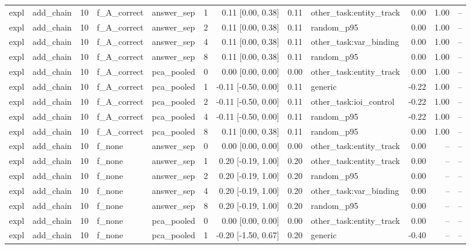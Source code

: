 \begin{tabular}{llrllrrrlrrr}
expl & add\_chain & 10 & f\_A\_correct & answer\_sep & 1 & 0.11 [0.00, 0.38] & 0.11 & other\_task:entity\_track & 0.00 & 1.00 & -- \\
expl & add\_chain & 10 & f\_A\_correct & answer\_sep & 2 & 0.11 [0.00, 0.38] & 0.11 & random\_p95 & 0.00 & 1.00 & -- \\
expl & add\_chain & 10 & f\_A\_correct & answer\_sep & 4 & 0.11 [0.00, 0.38] & 0.11 & other\_task:var\_binding & 0.00 & 1.00 & -- \\
expl & add\_chain & 10 & f\_A\_correct & answer\_sep & 8 & 0.11 [0.00, 0.38] & 0.11 & random\_p95 & 0.00 & 1.00 & -- \\
expl & add\_chain & 10 & f\_A\_correct & pca\_pooled & 0 & 0.00 [0.00, 0.00] & 0.00 & other\_task:entity\_track & 0.00 & 1.00 & -- \\
expl & add\_chain & 10 & f\_A\_correct & pca\_pooled & 1 & -0.11 [-0.50, 0.00] & 0.11 & generic & -0.22 & 1.00 & -- \\
expl & add\_chain & 10 & f\_A\_correct & pca\_pooled & 2 & -0.11 [-0.50, 0.00] & 0.11 & other\_task:ioi\_control & -0.22 & 1.00 & -- \\
expl & add\_chain & 10 & f\_A\_correct & pca\_pooled & 4 & -0.11 [-0.50, 0.00] & 0.11 & random\_p95 & -0.22 & 1.00 & -- \\
expl & add\_chain & 10 & f\_A\_correct & pca\_pooled & 8 & 0.11 [0.00, 0.38] & 0.11 & random\_p95 & 0.00 & 1.00 & -- \\
expl & add\_chain & 10 & f\_none & answer\_sep & 0 & 0.00 [0.00, 0.00] & 0.00 & other\_task:entity\_track & 0.00 & -- & -- \\
expl & add\_chain & 10 & f\_none & answer\_sep & 1 & 0.20 [-0.19, 1.00] & 0.20 & other\_task:entity\_track & 0.00 & -- & -- \\
expl & add\_chain & 10 & f\_none & answer\_sep & 2 & 0.20 [-0.19, 1.00] & 0.20 & random\_p95 & 0.00 & -- & -- \\
expl & add\_chain & 10 & f\_none & answer\_sep & 4 & 0.20 [-0.19, 1.00] & 0.20 & other\_task:var\_binding & 0.00 & -- & -- \\
expl & add\_chain & 10 & f\_none & answer\_sep & 8 & 0.20 [-0.19, 1.00] & 0.20 & random\_p95 & 0.00 & -- & -- \\
expl & add\_chain & 10 & f\_none & pca\_pooled & 0 & 0.00 [0.00, 0.00] & 0.00 & other\_task:entity\_track & 0.00 & -- & -- \\
expl & add\_chain & 10 & f\_none & pca\_pooled & 1 & -0.20 [-1.50, 0.67] & 0.20 & generic & -0.40 & -- & -- \\

\end{tabular}
